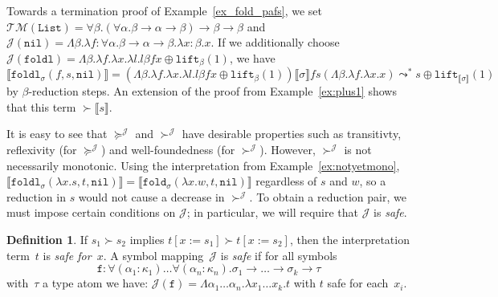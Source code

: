 \documentclass[a4paper,UKenglish,cleveref,autoref,numberwithinsect]{lipics-v2019}
\theoremstyle{definition}
\newtheorem{defn}[theorem]{Definition}
\newcommand{\arrtype}{\rightarrow}
\newcommand{\quant}[2]{\forall #1.#2}
\newcommand{\subst}[2]{#1:=#2}
\newcommand{\abs}[2]{\lambda #1.#2}
\newcommand{\tabs}[2]{\Lambda #1.#2}
\newcommand{\lift}{\mathtt{lift}}
\newcommand{\typeinterpret}[1]{\llbracket #1 \rrbracket}
\newcommand{\interpret}[1]{\llbracket #1 \rrbracket}
\newcommand{\Typemap}{\mathcal{T\!M}}
\newcommand{\Termmap}{\mathcal{J}}
\newcommand{\succinterpret}{\succ^{\Termmap}}
\newcommand{\succeqinterpret}{\succeq^{\Termmap}}
\newcommand{\List}{\mathtt{List}}
\newcommand{\nil}{\mathtt{nil}}
\begin{document}
\begin{example}\label{ex:notyetmono}
Towards a termination proof of Example~\ref{ex_fold_pafs},
we set $\Typemap(\List) = \forall \beta. (\forall \alpha.
\beta \arrtype \alpha \arrtype \beta) \arrtype \beta
\arrtype \beta$ and
$\Termmap(\nil) = \tabs{\beta}{\abs{f:\quant{\alpha}{\beta \arrtype
\alpha \arrtype \beta}}{\abs{x:\beta}{x}}}$.  If we additionally choose
$\Termmap(\mathtt{foldl}) = \tabs{\beta}{\abs{f}{\abs{x}{\abs{l}{l
\beta f x}}} \oplus \lift_\beta(1)}$, we have
$\interpret{\mathtt{foldl}_{\sigma}(f,s,\nil)} = (\tabs{\beta}{
  \abs{f}{\abs{x}{\abs{l}{l \beta f x}}} \oplus \lift_\beta(1)})
  \typeinterpret{\sigma} f s (\tabs{\beta}{\abs{f}{\abs{x}{x}}})
  \leadsto^* s \oplus \lift_{\interpret{\sigma}}(1)$ by
  $\beta$-reduction steps.
An extension of the proof from Example~\ref{ex:plus1} shows that
this term $\succ \interpret{s}$.
\end{example}

It is easy to see that $\succeqinterpret$ and
$\succinterpret$ have desirable properties such as transitivty,
reflexivity (for $\succeqinterpret$) and well-foundedness (for
$\succinterpret$).  However, $\succinterpret$ is not necessarily
monotonic.  Using the interpretation from Example~\ref{ex:notyetmono},
$\interpret{\mathtt{foldl}_{\sigma}(\abs{x}{s},t,\nil)} =
\interpret{\mathtt{fold}_{\sigma}(\abs{x}{w},t,\nil)}$ regardless of
$s$ and $w$, so a reduction in $s$ would not cause a decrease in
$\succinterpret$.  To obtain a reduction pair, we must impose certain
conditions on $\Termmap$; in particular, we will require that
$\Termmap$ is \emph{safe}.

\begin{defn}\label{def_safe}
  If $s_1 \succ s_2$ implies $t[\subst{x}{s_1}] \succ
  t[\subst{x}{s_2}]$, then the interpretation term~$t$ is \emph{safe
    for~$x$}. A symbol mapping~$\Termmap$ is \emph{safe} if for all
  symbols
  \[
  \mathtt{f} : \forall (\alpha_1 : \kappa_1) \ldots \forall (\alpha_n
  : \kappa_n) . \sigma_1 \arrtype \ldots \arrtype \sigma_k \arrtype
  \tau
  \]
  with~$\tau$ a type atom we have: $\Termmap(\mathtt{f}) =
  \tabs{\alpha_1 \dots \alpha_n}{\abs{x_1 \dots x_k}{t}}$ with $t$
  safe for each~$x_i$.
\end{defn}
\end{document}
